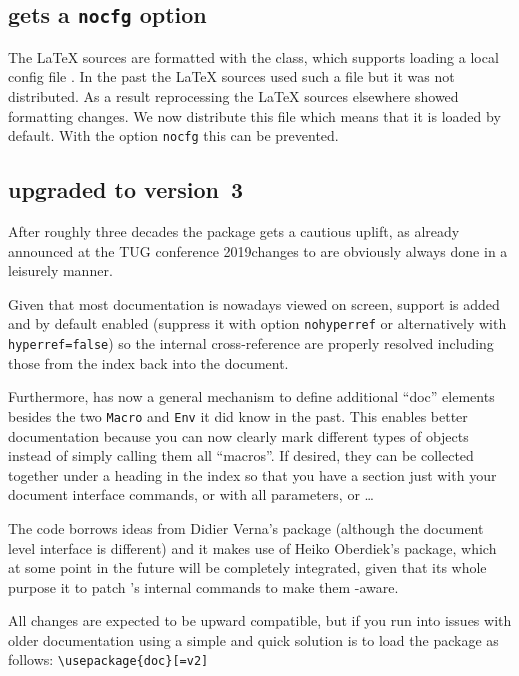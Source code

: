 \documentclass{ltnews}
\providecommand\Dash {\unskip \textemdash}
\providecommand\option[1]{\texttt{#1}}
\begin{document}
\subsection{ gets a \option{nocfg} option}

The \LaTeX{} sources are formatted with the  class,
which supports loading a local config file . In the
past the \LaTeX{} sources used such a file but it was not distributed.
As a result reprocessing the \LaTeX{} sources elsewhere showed
formatting changes.  We now distribute this file which means that it
is loaded by default. With the option \option{nocfg} this can be
prevented.


\subsection{ upgraded to version~3}

After roughly three decades the  package gets a cautious
uplift, as already announced at the TUG conference 2019\Dash changes
to  are obviously always done in a leisurely manner.

Given that most documentation is nowadays viewed on screen,
 support is added and by default enabled (suppress it
with option \option{nohyperref} or alternatively with
\option{hyperref}\texttt{=false}) so the internal cross-reference are
properly resolved including those from the index back into the
document.

Furthermore,  has now a general mechanism to define
additional \enquote{doc} elements besides the two \texttt{Macro} and
\texttt{Env} it did know in the past. This enables better
documentation because you can now clearly mark different types of
objects instead of simply calling them all \enquote{macros}.
If desired, they can be collected together under a heading
in the index so that you have a section just with your document
interface commands, or with all parameters, or \ldots

The code borrows ideas from Didier Verna's  package (although
the document level interface is different) and it makes use of Heiko
Oberdiek's  package, which at some point in the future
will be completely integrated, given that its whole purpose it to
patch 's internal commands to make them -aware.

All changes are expected to be upward compatible, but if you run into
issues with older documentation using  a simple and quick
solution is to load the package as follows:
\verb/\usepackage{doc}[=v2]/
\end{document}
